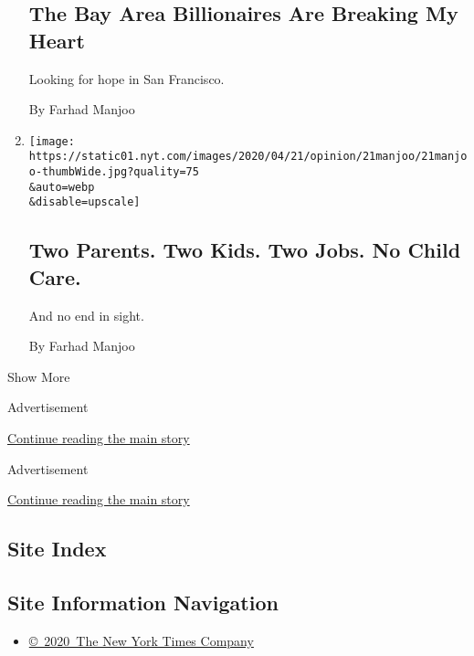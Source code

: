 \begin{enumerate}
  \hypertarget{the-bay-area-billionaires-are-breaking-my-heart}{%
  \subsection{The Bay Area Billionaires Are Breaking My
  Heart}\label{the-bay-area-billionaires-are-breaking-my-heart}}

  Looking for hope in San Francisco.

  By Farhad Manjoo
\item
  \href{/2020/04/22/opinion/coronavirus-parenting-burnout.html}{}

  \texttt{[image: https://static01.nyt.com/images/2020/04/21/opinion/21manjoo/21manjoo-thumbWide.jpg?quality=75\\\&auto=webp\\\&disable=upscale]}

  \hypertarget{two-parents-two-kids-two-jobs-no-child-care}{%
  \subsection{Two Parents. Two Kids. Two Jobs. No Child
  Care.}\label{two-parents-two-kids-two-jobs-no-child-care}}

  And no end in sight.

  By Farhad Manjoo
\end{enumerate}

Show More

Advertisement

\protect\hyperlink{after-mid1}{Continue reading the main story}

Advertisement

\protect\hyperlink{after-mktg}{Continue reading the main story}

\hypertarget{site-index}{%
\subsection{Site Index}\label{site-index}}

\hypertarget{site-information-navigation}{%
\subsection{Site Information
Navigation}\label{site-information-navigation}}

\begin{itemize}
\tightlist
\item
  \href{https://help.nytimes.com/hc/en-us/articles/115014792127-Copyright-notice}{©~2020~The
  New York Times Company}
\end{itemize}

